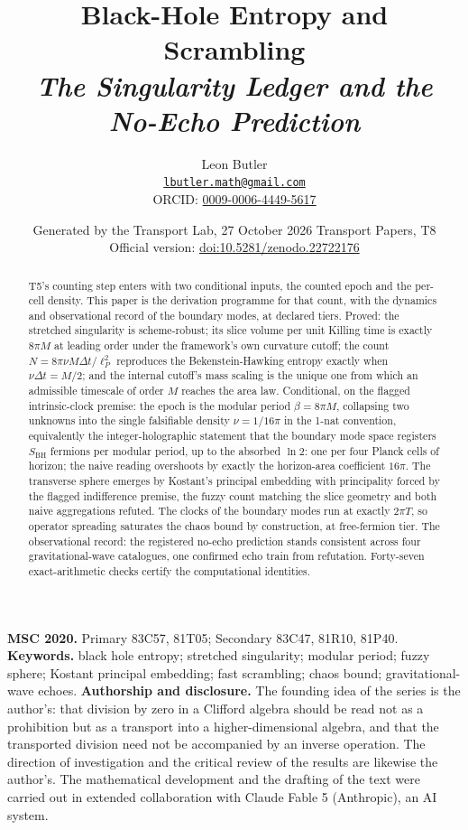 \documentclass[11pt]{article}
\title{\bfseries Black-Hole Entropy and Scrambling\\[4pt]\large\itshape The Singularity Ledger and the No-Echo Prediction}
\author{Leon Butler\\ \normalsize\href{mailto:lbutler.math@gmail.com}{\texttt{lbutler.math@gmail.com}}\\ \normalsize ORCID: \href{https://orcid.org/0009-0006-4449-5617}{0009-0006-4449-5617}}
\date{Generated by the Transport Lab, 27 October 2026 \textperiodcentered{} Transport Papers, T8\\[3pt]\small Official version: \href{https://doi.org/10.5281/zenodo.22722176}{doi:10.5281/zenodo.22722176}}
\theoremstyle{definition}
\theoremstyle{plain}
\providecommand{\SBH}{}\renewcommand{\SBH}{S_{\mathrm{BH}}}
\providecommand{\lP}{}\renewcommand{\lP}{\ell_{P}}
\begin{document}
\maketitle
\begin{abstract}
\normalsize
T5's counting step enters with two conditional inputs, the counted epoch and the per-cell density. This paper is the derivation programme for that count, with the dynamics and observational record of the boundary modes, at declared tiers. Proved: the stretched singularity is scheme-robust; its slice volume per unit Killing time is exactly $8\pi M$ at leading order under the framework's own curvature cutoff; the count $N = 8\pi\nu M\Delta t/\lP^2$ reproduces the Bekenstein-Hawking entropy exactly when $\nu\Delta t = M/2$; and the internal cutoff's mass scaling is the unique one from which an admissible timescale of order $M$ reaches the area law. Conditional, on the flagged intrinsic-clock premise: the epoch is the modular period $\beta = 8\pi M$, collapsing two unknowns into the single falsifiable density $\nu = 1/16\pi$ in the 1-nat convention, equivalently the integer-holographic statement that the boundary mode space registers $\SBH$ fermions per modular period, up to the absorbed $\ln 2$: one per four Planck cells of horizon; the naive reading overshoots by exactly the horizon-area coefficient $16\pi$. The transverse sphere emerges by Kostant's principal embedding with principality forced by the flagged indifference premise, the fuzzy count matching the slice geometry and both naive aggregations refuted. The clocks of the boundary modes run at exactly $2\pi T$, so operator spreading saturates the chaos bound by construction, at free-fermion tier. The observational record: the registered no-echo prediction stands consistent across four gravitational-wave catalogues, one confirmed echo train from refutation. Forty-seven exact-arithmetic checks certify the computational identities.
\end{abstract}
\medskip
\noindent\textbf{MSC 2020.} Primary 83C57, 81T05; Secondary 83C47, 81R10, 81P40.\\
\textbf{Keywords.} black hole entropy; stretched singularity; modular period; fuzzy sphere; Kostant principal embedding; fast scrambling; chaos bound; gravitational-wave echoes.
\newpage
\noindent \textbf{Authorship and disclosure. }The founding idea of the series is the author's: that division by zero in a Clifford algebra should be read not as a prohibition but as a transport into a higher-dimensional algebra, and that the transported division need not be accompanied by an inverse operation. The direction of investigation and the critical review of the results are likewise the author's. The mathematical development and the drafting of the text were carried out in extended collaboration with Claude Fable 5 (Anthropic), an AI system.
\end{document}

